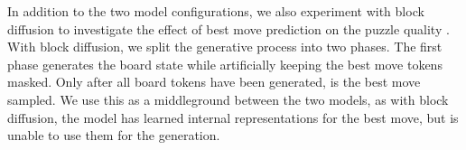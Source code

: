 \documentclass[letterpaper]{article} %
\begin{document}
In addition to the two model configurations, we also experiment with block diffusion to investigate the effect of best move prediction on the puzzle quality \cite{arriola2025blockdiffusion}. With block diffusion, we split the generative process into two phases. The first phase generates the board state while artificially keeping the best move tokens masked. Only after all board tokens have been generated, is the best move sampled. We use this as a middleground between the two models, as with block diffusion, the model has learned internal representations for the best move, but is unable to use them for the generation.



\end{document}

